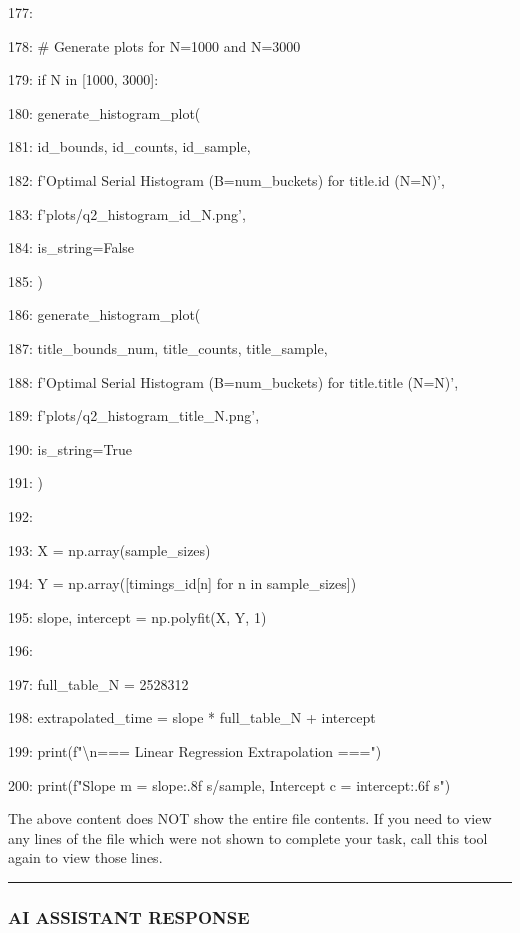 \documentclass[11pt,a4paper]{article}
\begin{document}
177:

178:         \# Generate plots for N=1000 and N=3000

179:         if N in [1000, 3000]:

180:             generate\_histogram\_plot(

181:                 id\_bounds, id\_counts, id\_sample,

182:                 f'Optimal Serial Histogram (B={num\_buckets}) for title.id (N={N})',

183:                 f'plots/q2\_histogram\_id\_{N}.png',

184:                 is\_string=False

185:             )

186:             generate\_histogram\_plot(

187:                 title\_bounds\_num, title\_counts, title\_sample,

188:                 f'Optimal Serial Histogram (B={num\_buckets}) for title.title (N={N})',

189:                 f'plots/q2\_histogram\_title\_{N}.png',

190:                 is\_string=True

191:             )

192:

193:     X = np.array(sample\_sizes)

194:     Y = np.array([timings\_id[n] for n in sample\_sizes])

195:     slope, intercept = np.polyfit(X, Y, 1)

196:

197:     full\_table\_N = 2528312

198:     extrapolated\_time = slope * full\_table\_N + intercept

199:     print(f"\textbackslash{}n=== Linear Regression Extrapolation ===")

200:     print(f"Slope m = {slope:.8f} s/sample, Intercept c = {intercept:.6f} s")

The above content does NOT show the entire file contents. If you need to view any lines of the file which were not shown to complete your task, call this tool again to view those lines.


\hrule

\subsubsection{AI ASSISTANT RESPONSE}
\end{document}
